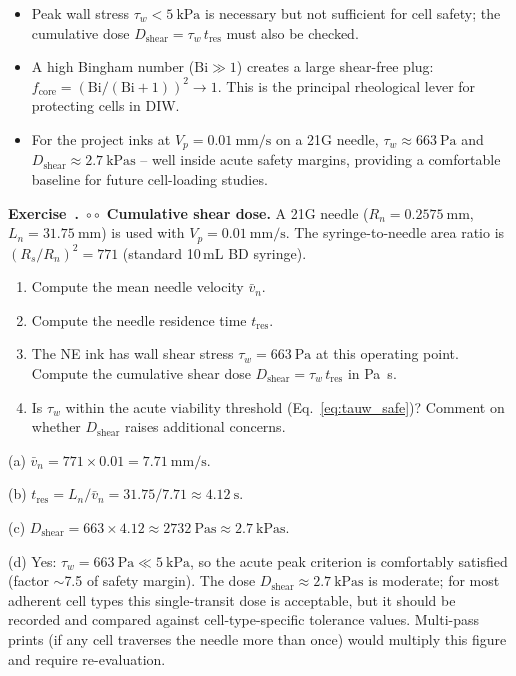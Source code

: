 \documentclass[11pt,a4paper]{article}
\newcommand{\diffB}{\textcolor{orange!80!black}{$\circ\circ$}}
\newcounter{exidx}[section]
\renewcommand{\theexidx}{\thesection.\arabic{exidx}}
\newenvironment{exercise}[1]%
  {\par\smallskip\refstepcounter{exidx}%
   \noindent\textbf{Exercise~\theexidx}~#1\quad}
  {\par\smallskip}
\newcommand{\Bi}{\mathrm{Bi}}
\begin{document}
\begin{takeawaybox}
\begin{itemize}[leftmargin=1.4em,itemsep=2pt]
\item Peak wall stress $\tau_w<\SI{5}{\kPa}$ is necessary but not
  sufficient for cell safety; the cumulative dose
  $D_\mathrm{shear}=\tau_w\,t_\mathrm{res}$ must also be checked.
\item A high Bingham number ($\Bi\gg1$) creates a large shear-free plug:
  $f_\mathrm{core}=(\Bi/(\Bi+1))^2\to1$.  This is the principal
  rheological lever for protecting cells in DIW.
\item For the project inks at $V_p=\SI{0.01}{\mm\per\s}$ on a 21G needle,
  $\tau_w\approx\SI{663}{\Pa}$ and $D_\mathrm{shear}\approx\SI{2.7}{\kPa\s}$
  -- well inside acute safety margins, providing a comfortable baseline for
  future cell-loading studies.
\end{itemize}
\end{takeawaybox}

\begin{exercise}{\diffB}
\textbf{Cumulative shear dose.}
A 21G needle ($R_n=\SI{0.2575}{\mm}$, $L_n=\SI{31.75}{\mm}$) is used
with $V_p=\SI{0.01}{\mm\per\s}$.  The syringe-to-needle area ratio is
$(R_s/R_n)^2=771$ (standard 10\,mL BD syringe).
\begin{enumerate}[label=(\alph*),leftmargin=1.6em,itemsep=1pt]
  \item Compute the mean needle velocity $\bar v_n$.
  \item Compute the needle residence time $t_\mathrm{res}$.
  \item The NE ink has wall shear stress $\tau_w=\SI{663}{\Pa}$ at this
    operating point.  Compute the cumulative shear dose
    $D_\mathrm{shear}=\tau_w\,t_\mathrm{res}$ in \si{\Pa\s}.
  \item Is $\tau_w$ within the acute viability threshold (Eq.~\ref{eq:tauw_safe})?
    Comment on whether $D_\mathrm{shear}$ raises additional concerns.
\end{enumerate}
\begin{solution}
(a) $\bar v_n = 771\times 0.01 = \SI{7.71}{\mm\per\s}$.

(b) $t_\mathrm{res} = L_n/\bar v_n = 31.75/7.71 \approx \SI{4.12}{\s}$.

(c) $D_\mathrm{shear} = 663\times 4.12 \approx \SI{2732}{\Pa\s}
    \approx \SI{2.7}{\kPa\s}$.

(d) Yes: $\tau_w = \SI{663}{\Pa} \ll \SI{5}{\kPa}$, so the acute peak
criterion is comfortably satisfied (factor $\sim$7.5 of safety margin).
The dose $D_\mathrm{shear}\approx\SI{2.7}{\kPa\s}$ is moderate; for
most adherent cell types this single-transit dose is acceptable, but it
should be recorded and compared against cell-type-specific tolerance
values. Multi-pass prints (if any cell traverses the needle more than
once) would multiply this figure and require re-evaluation.
\end{solution}
\end{exercise}
\end{document}
